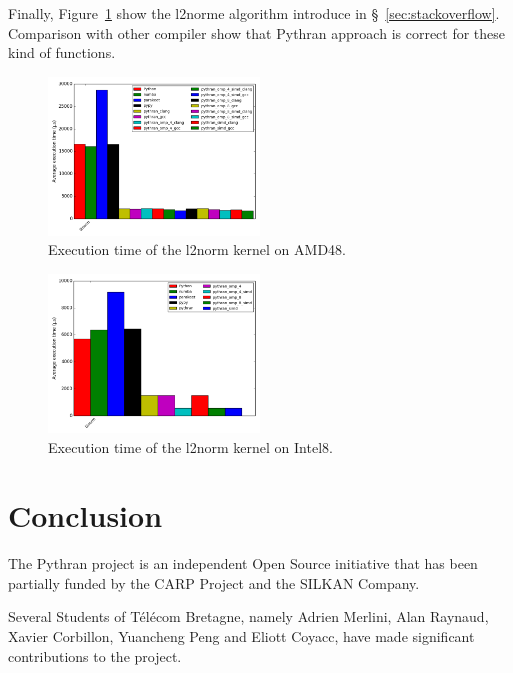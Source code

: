 \documentclass[10pt, preprint]{sigplanconf}
\begin{document}
Finally, Figure~\ref{fig:l2norme} show the l2norme algorithm introduce in
\S~\ref{sec:stackoverflow}. Comparison with other compiler show that Pythran approach
is correct for these kind of functions.
\begin{figure}[t]
\centering
\includegraphics[width=0.5\textwidth]{l2norm_amd48.png}
\caption{Execution time of the l2norm kernel on AMD48.}
\label{fig:l2norme}
\end{figure}

\begin{figure}[t]
\centering
\includegraphics[width=0.5\textwidth]{l2norm_intel8.png}
\caption{Execution time of the l2norm kernel on Intel8.}
\label{fig:l2norm_intel8}
\end{figure}

\section*{Conclusion}

\acks

The Pythran project is an independent Open Source initiative that has been
partially funded by the CARP Project and the SILKAN Company.

Several Students of Télécom Bretagne, namely Adrien Merlini, Alan Raynaud,
Xavier Corbillon, Yuancheng Peng and Eliott Coyacc, have made significant
contributions to the project.




\end{document}
